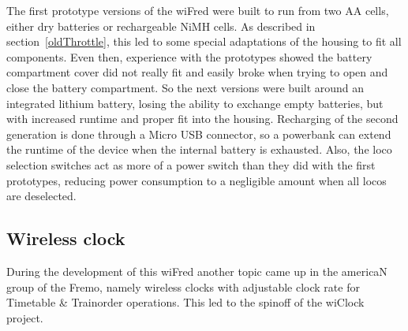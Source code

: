 \documentclass[11pt,a4paper]{scrartcl}
\begin{document}
The first prototype versions of the wiFred were built to run from two AA cells, either dry batteries or rechargeable NiMH cells. As described in section~\ref{oldThrottle}, this led to some special adaptations of the housing to fit all components. Even then, experience with the prototypes showed the battery compartment cover did not really fit and easily broke when trying to open and close the battery compartment. So the next versions were built around an integrated lithium battery, losing the ability to exchange empty batteries, but with increased runtime and proper fit into the housing. Recharging of the second generation is done through a Micro USB connector, so a powerbank can extend the runtime of the device when the internal battery is exhausted. Also, the loco selection switches act as more of a power switch than they did with the first prototypes, reducing power consumption to a negligible amount when all locos are deselected.

\subsection{Wireless clock}

During the development of this wiFred another topic came up in the americaN group of the Fremo, namely wireless clocks with adjustable clock rate for Timetable \& Trainorder operations. This led to the spinoff of the wiClock project\cite{wiClock}.

\clearpage

\begin{thebibliography}{99}
\end{thebibliography}
\end{document}
